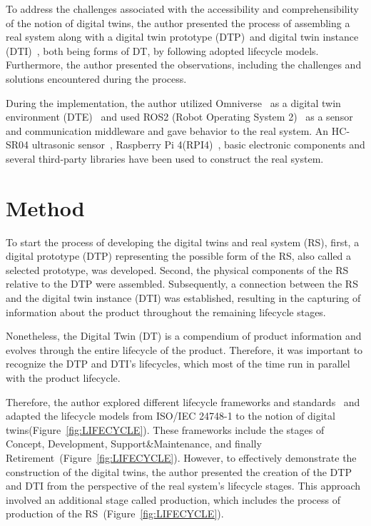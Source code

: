 \documentclass[conference]{IEEEtran}
\begin{document}
    To address the challenges associated with the accessibility and comprehensibility of the notion of digital twins, the author presented the
    process of assembling a real system along with a digital twin prototype (DTP)~\cite{Originsofdigitaltwinconcept}and digital twin instance (DTI)~\cite{Originsofdigitaltwinconcept}, both being forms of DT, 
    by following adopted lifecycle models. Furthermore, the author presented the observations, including the challenges and solutions encountered during the process.

    During the implementation, the author utilized Omniverse~\cite{Omniverse} as a digital twin environment (DTE)~\cite{Originsofdigitaltwinconcept} and used ROS2 (Robot Operating System 2)~\cite{ROS2}
    as a sensor and communication middleware and gave behavior to the real system. An HC-SR04 ultrasonic sensor~\cite{HCSR04}, Raspberry Pi 4(RPI4)~\cite{RPI4}, 
    basic electronic components and several third-party libraries have been used to construct the real system. 

    \section{Method}\label{section:Method}
    To start the process of developing the digital twins and real system (RS), first, a digital prototype (DTP) 
    representing the possible form of the RS, also called a selected prototype, was developed. 
    Second, the physical components of the RS relative to the DTP were assembled. 
    Subsequently, a connection between the RS and the digital twin instance (DTI) was established, 
    resulting in the capturing of information about the product throughout the remaining lifecycle stages.

    Nonetheless, the Digital Twin (DT) is a compendium of product information and evolves through the entire lifecycle of the product. 
    Therefore, it was important to recognize the DTP and DTI's lifecycles, which most of the time run in parallel with the product lifecycle.

    Therefore, the author explored different lifecycle frameworks and standards~\cite{ISO/IEC/IEEE12207,ISO/IEC/IEEE15288,ISO/IEC/IEEE24748-1:2018} and adapted the lifecycle models 
    from ISO/IEC 24748-1 to the notion of digital twins(Figure~\ref{fig:LIFECYCLE}). 
    These frameworks include the stages of  Concept, Development, Support\&Maintenance, and finally Retirement~\cite{ISO/IEC/IEEE24748-1:2018}(Figure~\ref{fig:LIFECYCLE}). 
    However, to effectively demonstrate the construction of the digital twins, the author presented the creation of the DTP and DTI from the perspective of the real system's lifecycle stages. 
    This approach involved an additional stage called production, which includes the process of production of the RS~\cite{ISO/IEC/IEEE24748-1:2018}(Figure~\ref{fig:LIFECYCLE}).
\end{document}

